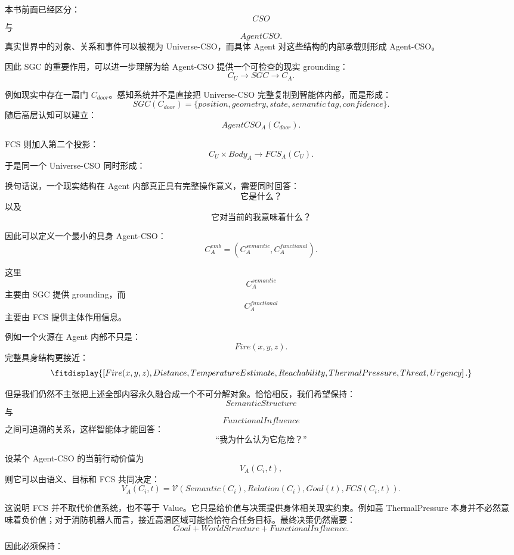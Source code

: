 本书前面已经区分：
\[
CSO
\]
与
\[
AgentCSO.
\]
真实世界中的对象、关系和事件可以被视为 Universe-CSO，而具体 Agent 对这些结构的内部承载则形成 Agent-CSO。

因此 SGC 的重要作用，可以进一步理解为给 Agent-CSO 提供一个可检查的现实 grounding：
\[
C_U
\longrightarrow
SGC
\longrightarrow
C_A.
\]

例如现实中存在一扇门 $C_{door}$。感知系统并不是直接把 Universe-CSO 完整复制到智能体内部，而是形成：
\[
SGC(C_{door})
=
\{
position,
geometry,
state,
semantic\ tag,
confidence
\}.
\]
随后高层认知可以建立：
\[
AgentCSO_A(C_{door}).
\]

FCS 则加入第二个投影：
\[
C_U
\times
Body_A
\longrightarrow
FCS_A(C_U).
\]
于是同一个 Universe-CSO 同时形成：
\begin{statementbox}
\centering
{}
\end{statementbox}

换句话说，一个现实结构在 Agent 内部真正具有完整操作意义，需要同时回答：
\[
\text{它是什么？}
\]
以及
\[
\text{它对当前的我意味着什么？}
\]

因此可以定义一个最小的具身 Agent-CSO：
\[
C_A^{emb}
=
\left(
C_A^{semantic},
C_A^{functional}
\right).
\]

这里
\[
C_A^{semantic}
\]
主要由 SGC 提供 grounding，而
\[
C_A^{functional}
\]
主要由 FCS 提供主体作用信息。

例如一个火源在 Agent 内部不只是：
\[
Fire(x,y,z).
\]
完整具身结构更接近：
\[
\fitdisplay{
\left[
Fire(x,y,z),
Distance,
TemperatureEstimate,
Reachability,
ThermalPressure,
Threat,
Urgency
\right].
}
\]

但是我们仍然不主张把上述全部内容永久融合成一个不可分解对象。恰恰相反，我们希望保持：
\[
SemanticStructure
\]
与
\[
FunctionalInfluence
\]
之间可追溯的关系，这样智能体才能回答：
\[
\text{“我为什么认为它危险？”}
\]

设某个 Agent-CSO 的当前行动价值为
\[
V_A(C_i,t),
\]
则它可以由语义、目标和 FCS 共同决定：
\[
V_A(C_i,t)
=
\mathcal V
\left(
Semantic(C_i),
Relation(C_i),
Goal(t),
FCS(C_i,t)
\right).
\]

这说明 FCS 并不取代价值系统，也不等于 Value。它只是给价值与决策提供身体相关现实约束。例如高 ThermalPressure 本身并不必然意味着负价值；对于消防机器人而言，接近高温区域可能恰恰符合任务目标。最终决策仍然需要：
\[
Goal
+
WorldStructure
+
FunctionalInfluence.
\]

因此必须保持：
\begin{statementbox}
\centering
{}
\end{statementbox}

